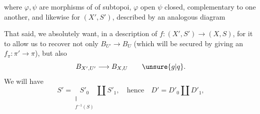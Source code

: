 
where $\varphi,\psi$ are morphisms of  of subtopoi, $\varphi$ open $\psi$ closed, complementary to one another, and likewise for $(X',S')$, described by an analogous diagram

That said, we absolutely want, in a description of
$f:(X',S')\longrightarrow(X,S)$, for it to allow us to recover not only $B_{U'}\longrightarrow B_U$ (which will be secured by giving an $f_\pi:\pi'\longrightarrow\pi$), but also
\[
B_{X',U'}\longrightarrow B_{X,U}\qquad\unsure{g|q}.
\]
We will have 
\[
S'=\underset{\substack{\Vert\\f^{-1}(S)}}{S'_0}\amalg S'_1,
\quad\text{hence}\quad D'=D'_0\amalg D'_1,
\]


